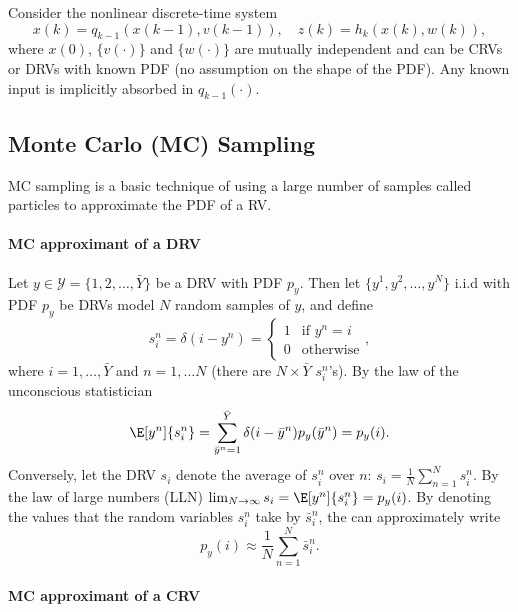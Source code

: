 \documentclass[]{hsrzf}
\theoremstyle{plain}
\theoremstyle{definition}
\theoremstyle{remark}
\begin{document}
Consider the nonlinear discrete-time system
\[
  x(k) = q_{k-1}(x(k-1), v(k-1)),
  \quad
  z(k) = h_k(x(k), w(k)),
\]
where $x(0)$, $\{v(\cdot)\}$ and $\{w(\cdot)\}$ are mutually independent and
can be CRVs or DRVs with known PDF (no assumption on the shape of the PDF).
Any known input is implicitly absorbed in $q_{k-1}(\cdot)$.

\subsection{Monte Carlo (MC) Sampling}

\ifexamprint\else
MC sampling is a basic technique of using a large number of samples called
particles to approximate the PDF of a RV.
\fi

\paragraph{MC approximant of a DRV}

Let $y \in \mathcal{Y} = \{1,2,\ldots,\bar{Y}\}$ be a DRV with PDF $p_y$.
Then let $\{y^1, y^2, \ldots, y^N\}$ i.i.d with PDF $p_y$ be DRVs model
$N$ random samples of $y$, and define
\[
  s_i^n = \delta(i - y^n) = \begin{cases} 1 & \text{if } y^n = i \\
    0 & \text{otherwise} \end{cases},
\]
where $i = 1,\ldots,\bar{Y}$ and $n = 1, \ldots N$ (there are $N\times
\bar{Y}$ $s_i^n$'s). By the law of the unconscious statistician
\[
  \E[y^n]{s^n_i} =
    \sum_{\bar{y}^n = 1}^{\bar{Y}} \delta(i - \bar{y}^n) p_y(\bar{y}^n)
    = p_y(i).
\]
Conversely, let the DRV $s_i$ denote the average of $s_i^n$ over $n$: $s_i =
\frac{1}{N} \sum_{n=1}^N s_i^n$. By the law of large numbers
(LLN) $\lim_{N\to\infty} s_i = \E[y^n]{s_i^n} = p_y(i)$. By denoting the values that
the random variables $s_i^n$ take by $\bar{s}_i^n$, the can approximately
write
\[
  p_y(i) \approx \frac{1}{N} \sum_{n=1}^N \bar{s}_i^n.
\]

\paragraph{MC approximant of a CRV}
\end{document}
